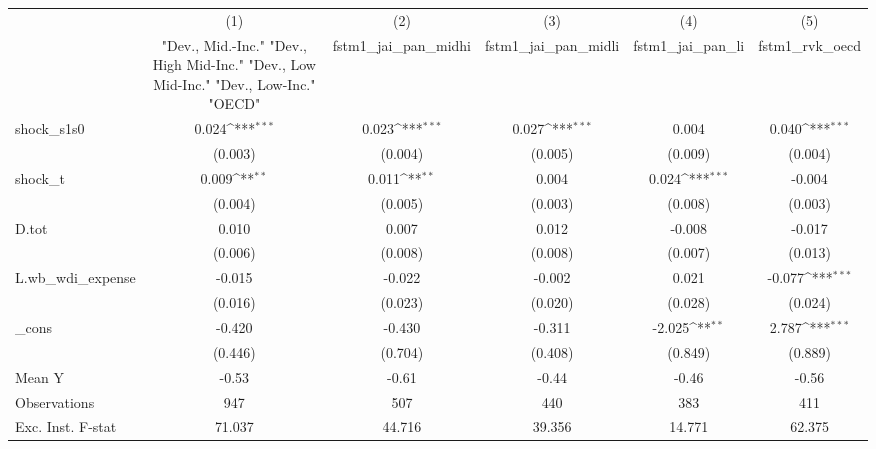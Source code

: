 {
\def\sym#1{\ifmmode^{#1}\else\(^{#1}\)\fi}
\begin{tabular}{l*{5}{c}}
\toprule
            &\multicolumn{1}{c}{(1)}&\multicolumn{1}{c}{(2)}&\multicolumn{1}{c}{(3)}&\multicolumn{1}{c}{(4)}&\multicolumn{1}{c}{(5)}\\
            &\multicolumn{1}{c}{ "Dev., Mid.-Inc." "Dev., High Mid-Inc." "Dev., Low Mid-Inc." "Dev., Low-Inc." "OECD" }&\multicolumn{1}{c}{fstm1\_jai\_pan\_midhi}&\multicolumn{1}{c}{fstm1\_jai\_pan\_midli}&\multicolumn{1}{c}{fstm1\_jai\_pan\_li}&\multicolumn{1}{c}{fstm1\_rvk\_oecd}\\
\midrule
shock\_s1s0  &       0.024\sym{***}&       0.023\sym{***}&       0.027\sym{***}&       0.004         &       0.040\sym{***}\\
            &     (0.003)         &     (0.004)         &     (0.005)         &     (0.009)         &     (0.004)         \\
\addlinespace
shock\_t     &       0.009\sym{**} &       0.011\sym{**} &       0.004         &       0.024\sym{***}&      -0.004         \\
            &     (0.004)         &     (0.005)         &     (0.003)         &     (0.008)         &     (0.003)         \\
\addlinespace
D.tot       &       0.010         &       0.007         &       0.012         &      -0.008         &      -0.017         \\
            &     (0.006)         &     (0.008)         &     (0.008)         &     (0.007)         &     (0.013)         \\
\addlinespace
L.wb\_wdi\_expense&      -0.015         &      -0.022         &      -0.002         &       0.021         &      -0.077\sym{***}\\
            &     (0.016)         &     (0.023)         &     (0.020)         &     (0.028)         &     (0.024)         \\
\addlinespace
\_cons      &      -0.420         &      -0.430         &      -0.311         &      -2.025\sym{**} &       2.787\sym{***}\\
            &     (0.446)         &     (0.704)         &     (0.408)         &     (0.849)         &     (0.889)         \\
\midrule
Mean Y      &       -0.53         &       -0.61         &       -0.44         &       -0.46         &       -0.56         \\
Observations&         947         &         507         &         440         &         383         &         411         \\
Exc. Inst. F-stat&      71.037         &      44.716         &      39.356         &      14.771         &      62.375         \\
\bottomrule
\end{tabular}
}
